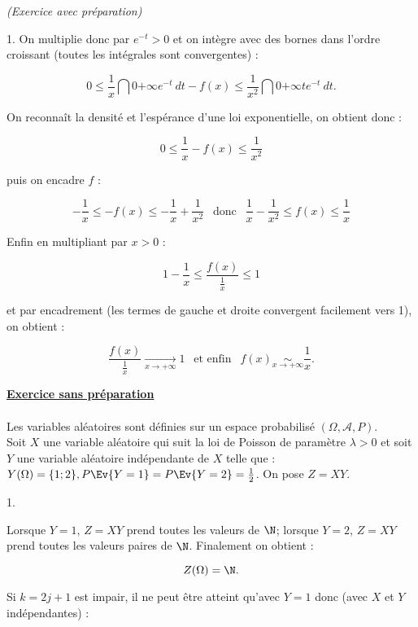 \documentclass[11pt]{article}%
\begin{document}
\begin{exercice}{\it (Exercice avec préparation)}
\begin{noliste}{1.}
 On multiplie donc par $e^{-t} > 0$ et on intègre avec des bornes dans
l'ordre croissant (toutes les intégrales sont convergentes) : 
 
\[
 0 \leq \frac{1}{x} \dint{0}{ + \infty} e^{ - t } \ dt - f(x) \leq
\frac{1}{x^{2}} \dint{0}{+ \infty} t e^{-t} \ dt. 
\]

 On reconnaît la densité et l'espérance d'une loi exponentielle, on
obtient donc : 
 
\[
 0 \leq \frac{ 1 }{ x } - f(x) \leq \frac{ 1 }{ x^{2} } 
\]

 puis on encadre $f$ : 
 
\[
 - \frac{1}{x} \leq - f(x) \leq - \frac{1}{x} + \frac{1}{x^{2}} \ \
\text{ donc } \ \ \frac{ 1 }{ x } - \frac{ 1 }{ x^{2} } \leq f(x) \leq
\frac{1}{ x } 
\]

 Enfin en multipliant par $x > 0$ : 
 
\[
 1 - \frac{ 1 }{ x } \leq \frac{ f(x) }{ \frac{ 1 }{ x } } \leq 1 
\]

 et par encadrement (les termes de gauche et droite convergent
facilement vers 1), on obtient : 
 
\[
 \frac{ f(x) }{ \frac{ 1 }{ x } } \xrightarrow[ x \rightarrow + \infty
]{} 1 \ \ \text{ et enfin } \ \ f(x) \underset{ x \rightarrow + \infty
}{ \sim } \frac{ 1 }{ x }. 
\]

 \end{noliste}

 \indent

 \noindent \textbf{\underline{Exercice sans préparation}} \\
\\
 Les variables aléatoires sont définies sur un espace probabilisé
$(\Omega, \mathcal{A}, P)$. \\
 Soit $X$ une variable aléatoire qui suit la loi de Poisson de
paramètre $\lambda > 0$ et soit $Y$ une variable aléatoire indépendante
de $X$ telle que : $ Y ( \Omega ) = \{ 1 ; 2 \}, P \Ev{ Y = 1 } = P
\Ev{ Y = 2 } = \frac{ 1 }{ 2 }$. On pose $Z = X Y$.
 \begin{noliste}{1.}
 \setlength{\itemsep}{4mm}

 \item Lorsque $Y = 1$, $Z = X Y$ prend toutes les valeurs de $\N$;
lorsque $Y = 2$, $Z = X Y$ prend toutes les valeurs paires de $\N$.
Finalement on obtient : 
 
\[
 Z ( \Omega ) = \N. 
\]

 Si $k = 2 j + 1$ est impair, il ne peut être atteint qu'avec $Y = 1$
donc (avec $X$ et $Y$ indépendantes) : 
 

\end{noliste}
\end{exercice}
\end{document}
